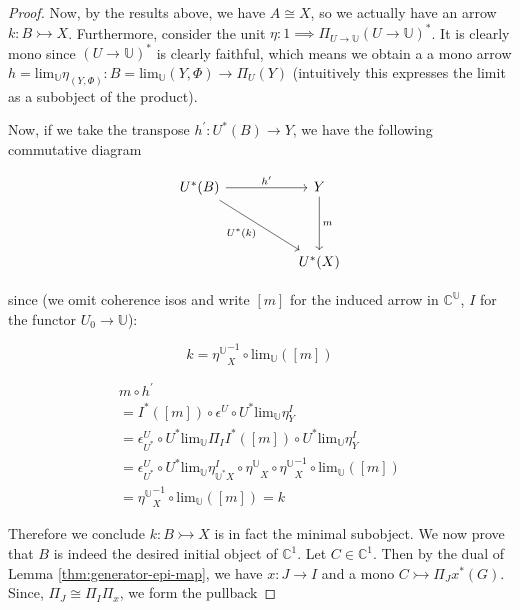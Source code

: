 \documentclass[10pt, oneside]{article}
\begin{document}
\begin{proof}
    Now, by the results above, we have $A \cong X$, so we actually have an arrow $k: B \rightarrowtail X$. Furthermore, consider the unit $\eta: 1 \implies \Pi_{U \to \mathbb{U}} (U \to \mathbb{U})^\ast$. It is clearly mono since $(U \to \mathbb{U})^\ast$ is clearly faithful, which means we obtain a a mono arrow $h = \mathrm{lim}_{\mathbb{U}} \eta_{(Y, \Phi)}: B = \mathrm{lim}_{\mathbb{U}}(Y, \Phi) \to \Pi_U (Y)$ (intuitively this expresses the limit as a subobject of the product).

    Now, if we take the transpose $h^\prime: U^\ast(B) \to Y$, we have the following commutative diagram

    \[\begin{tikzcd}[ampersand replacement=\&]
	{U^\ast(B)} \&\& Y \\
	\\
	\&\& {U^\ast(X)}
	\arrow["{U^\ast (k)}"', from=1-1, to=3-3]
	\arrow["{h^\prime}", from=1-1, to=1-3]
	\arrow["m", from=1-3, to=3-3]
    \end{tikzcd}\]
    
    \noindent since (we omit coherence isos and write $[m]$ for the induced arrow in $\mathbb{C}^\mathbb{U}$, $I$ for the functor $U_0 \to \mathbb{U}$):

    $$k = {\eta^{\mathbb{U}}}^{-1}_{X} \circ \mathrm{lim}_{\mathbb{U}}{([m])}$$

    \begin{align*}
        m \circ h^\prime
        \\ = I^\ast ([m]) \circ \epsilon^U \circ U^\ast \mathrm{lim}_{\mathbb{U}} \eta^{I}_Y
        \\ = \epsilon^U_{U^\ast} \circ U^\ast \mathrm{lim}_{\mathbb{U}} \Pi_I I^\ast ([m]) \circ U^\ast \mathrm{lim}_{\mathbb{U}} \eta^{I}_Y
        \\ = \epsilon^U_{U^\ast} \circ  U^\ast \mathrm{lim}_{\mathbb{U}} \eta^{I}_{\mathbb{U}^\ast X} \circ {\eta^{\mathbb{U}}}_{X} \circ {\eta^{\mathbb{U}}}^{-1}_{X} \circ \mathrm{lim}_{\mathbb{U}}{([m])}
        \\ = {\eta^{\mathbb{U}}}^{-1}_{X} \circ \mathrm{lim}_{\mathbb{U}}{([m])} = k
    \end{align*}

    Therefore we conclude $k: B \rightarrowtail X$ is in fact the minimal subobject.  We now prove that $B$ is indeed the desired initial object of $\mathbb{C}^1$. Let $C \in \mathbb{C}^1$. Then by the dual of Lemma \ref{thm:generator-epi-map}, we have $x: J \to I$ and a mono $C \rightarrowtail \Pi_J x^\ast (G)$. Since, $\Pi_J \cong \Pi_I \Pi_x$, we form the pullback


\end{proof}
\end{document}
